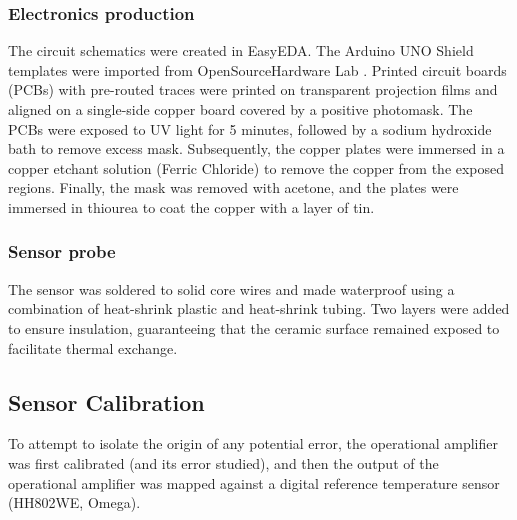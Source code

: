 \documentclass[conference]{IEEEtran}
\begin{document}

      \subsubsection{Electronics production}
      The circuit schematics were created in EasyEDA. The Arduino UNO Shield templates were imported from OpenSourceHardware Lab \cite{ArduinoShieldEasyEDA}.
      Printed circuit boards (PCBs) with pre-routed traces were printed on transparent projection films and aligned on a single-side copper board covered by a positive photomask.
      The PCBs were exposed to UV light for 5 minutes, followed by a sodium hydroxide bath to remove excess mask. Subsequently, the copper plates were immersed in a copper etchant solution (Ferric Chloride)
      to remove the copper from the exposed regions. Finally, the mask was removed with acetone, and the plates were immersed in thiourea to coat the copper with a layer of tin.
      \subsubsection{Sensor probe}
      The sensor was soldered to solid core wires and made waterproof using a combination of heat-shrink plastic and heat-shrink tubing. Two layers were added
      to ensure insulation, guaranteeing that the ceramic surface remained exposed to facilitate thermal exchange.
      \subsection{Sensor Calibration}
      To attempt to isolate the origin of any potential error, the operational amplifier was first calibrated (and its error studied), and then the output of the 
      operational amplifier was mapped against a digital reference temperature sensor (HH802WE, Omega).
\end{document}

